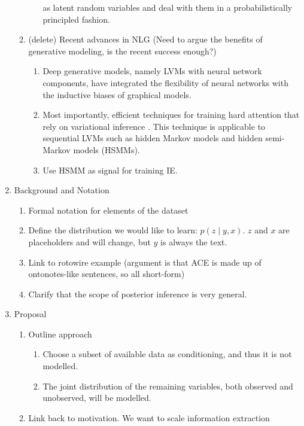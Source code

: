 \documentclass[11pt]{article}
\begin{document}
\begin{enumerate}
\begin{enumerate}
\begin{enumerate}
            as latent random variables and deal with them in a probabilistically principled 
            fashion.
        \end{enumerate}
    \item (delete) Recent advances in NLG
        (Need to argue the benefits of generative modeling, is the recent success enough?)
        \begin{enumerate}
        \item Deep generative models, namely LVMs with neural network components,
            have integrated the flexibility of neural networks with the
            inductive biases of graphical models.
        \item Most importantly, efficient techniques for training hard attention 
            that rely on variational inference \citep{deng2018attn}.
            This technique is applicable to sequential LVMs such as hidden Markov models 
            and hidden semi-Markov models (HSMMs).
        \item Use HSMM as signal for training IE.
        \end{enumerate}
    \end{enumerate}
\item Background and Notation
    \begin{enumerate}
    \item Formal notation for elements of the dataset
    \item Define the distribution we would like to learn: $p(z\mid y, x)$.
        $z$ and $x$ are placeholders and will change, but $y$ is always the text.
    \item Link to rotowire example
        (argument is that ACE is made up of ontonotes-like sentences, so all short-form)
    \item Clarify that the scope of posterior inference is very general.
    \end{enumerate}
\item Proposal
    \begin{enumerate}
    \item Outline approach
        \begin{enumerate}
        \item Choose a subset of available data as conditioning,
            and thus it is not modelled.
        \item The joint distribution of the remaining variables,
            both observed and unobserved, will be modelled.
        \end{enumerate}
    \item Link back to motivation. We want to scale information extraction

\end{enumerate}
\end{enumerate}
\end{document}
